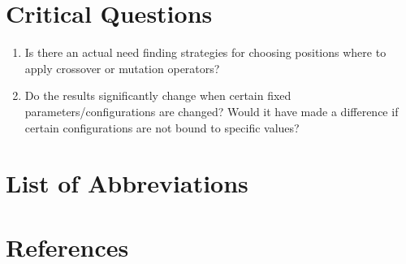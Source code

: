 \documentclass[oneside, notitlepage, twocolumn]{scrartcl}
\begin{document}
\section{Critical Questions}
\begin{enumerate}
    \item Is there an actual need finding strategies for choosing positions where to apply crossover or mutation operators?
    \item Do the results significantly change when certain fixed parameters/configurations are changed? Would it have made a difference if certain configurations are not bound to specific values?
\end{enumerate}

\section{List of Abbreviations}
\begin{acronym}
\end{acronym}

\section{References}
\begingroup
\renewcommand{\section}[2]{}%
\nocite{*}
\printbibliography
\endgroup
\end{document}
